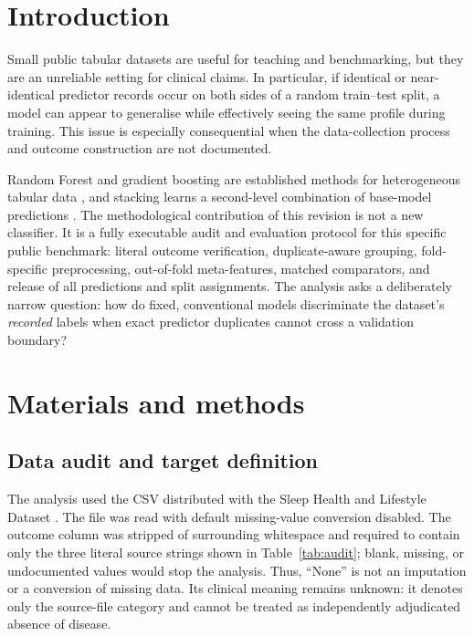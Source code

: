 \documentclass[preprint,12pt]{elsarticle}
\begin{document}
\section{Introduction}

Small public tabular datasets are useful for teaching and benchmarking, but they are an unreliable setting for clinical claims. In particular, if identical or near-identical predictor records occur on both sides of a random train--test split, a model can appear to generalise while effectively seeing the same profile during training. This issue is especially consequential when the data-collection process and outcome construction are not documented.

Random Forest and gradient boosting are established methods for heterogeneous tabular data \cite{breiman2001,chen2016}, and stacking learns a second-level combination of base-model predictions \cite{wolpert1992}. The methodological contribution of this revision is not a new classifier. It is a fully executable audit and evaluation protocol for this specific public benchmark: literal outcome verification, duplicate-aware grouping, fold-specific preprocessing, out-of-fold meta-features, matched comparators, and release of all predictions and split assignments. The analysis asks a deliberately narrow question: how do fixed, conventional models discriminate the dataset's \emph{recorded} labels when exact predictor duplicates cannot cross a validation boundary?

\section{Materials and methods}

\subsection{Data audit and target definition}

The analysis used the CSV distributed with the Sleep Health and Lifestyle Dataset \cite{kaggle_sleep}. The file was read with default missing-value conversion disabled. The outcome column was stripped of surrounding whitespace and required to contain only the three literal source strings shown in Table~\ref{tab:audit}; blank, missing, or undocumented values would stop the analysis. Thus, ``None'' is not an imputation or a conversion of missing data. Its clinical meaning remains unknown: it denotes only the source-file category and cannot be treated as independently adjudicated absence of disease.
\end{document}
